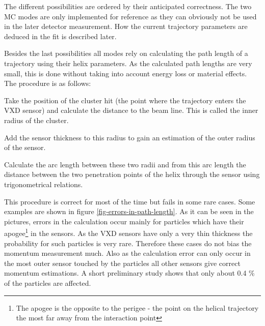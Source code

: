 The different possibilities are ordered by their anticipated correctness. The two MC modes are only implemented for reference as they can obviously not be used in the later detector measurement. How the current trajectory parameters are deduced in the fit is described later.

Besides the last possibilities all modes rely on calculating the path length of a trajectory using their helix parameters. As the calculated path lengths are very small, this is done without taking into account energy loss or material effects. The procedure is as follows:
\begin{zlist}
 \item Take the position of the cluster hit (the point where the trajectory enters the VXD sensor) and calculate the distance to the beam line. This is called the inner radius of the cluster.
 \item Add the sensor thickness to this radius to gain an estimation of the outer radius of the sensor.
 \item Calculate the arc length between these two radii and from this arc length the distance between the two penetration points of the helix through the sensor using trigonometrical relations.
\end{zlist}

This procedure is correct for most of the time but fails in some rare cases. Some examples are shown in figure \ref{fig-errors-in-path-length}. As it can be seen in the pictures, errors in the calculation occur mainly for particles which have their apogee\footnote{The apogee is the opposite to the perigee - the point on the helical trajectory the most far away from the interaction point} in the sensors. As the VXD sensors have only a very thin thickness the probability for such particles is very rare. Therefore these cases do not bias the momentum measurement much. Also as the calculation error can only occur in the most outer sensor touched by the particles all other sensors give correct momentum estimations. A short preliminary study shows that only about 0.4 \% of the particles are affected.

